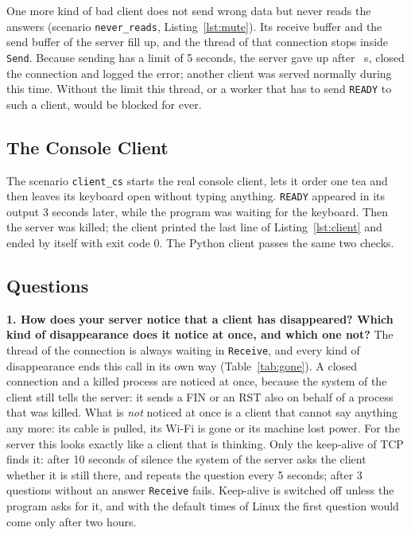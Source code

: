 \documentclass[12pt,a4paper]{article}
\begin{document}


One more kind of bad client does not send wrong data but never reads the answers (scenario \texttt{never\_reads}, Listing~\ref{lst:mute}). Its receive buffer and the send buffer of the server fill up, and the thread of that connection stops inside \texttt{Send}. Because sending has a limit of 5 seconds, the server gave up after \muteSeconds~s, closed the connection and logged the error; another client was served normally during this time. Without the limit this thread, or a worker that has to send \texttt{READY} to such a client, would be blocked for ever.



\subsection{The Console Client}

The scenario \texttt{client\_cs} starts the real console client, lets it order one tea and then leaves its keyboard open without typing anything. \texttt{READY} appeared in its output 3 seconds later, while the program was waiting for the keyboard. Then the server was killed; the client printed the last line of Listing~\ref{lst:client} and ended by itself with exit code 0. The Python client passes the same two checks.



\subsection{Questions}

\textbf{1. How does your server notice that a client has disappeared? Which kind of disappearance does it notice at once, and which one not?} The thread of the connection is always waiting in \texttt{Receive}, and every kind of disappearance ends this call in its own way (Table~\ref{tab:gone}). A closed connection and a killed process are noticed at once, because the system of the client still tells the server: it sends a FIN or an RST also on behalf of a process that was killed. What is \emph{not} noticed at once is a client that cannot say anything any more: its cable is pulled, its Wi-Fi is gone or its machine lost power. For the server this looks exactly like a client that is thinking. Only the keep-alive of TCP finds it: after 10 seconds of silence the system of the server asks the client whether it is still there, and repeats the question every 5 seconds; after 3 questions without an answer \texttt{Receive} fails. Keep-alive is switched off unless the program asks for it, and with the default times of Linux the first question would come only after two hours.
\end{document}
